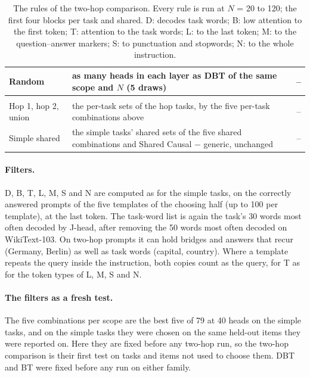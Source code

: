 \documentclass[10pt,a4paper]{article}
\begin{document}
\begin{table}[tbp]
\begin{tabularx}{\textwidth}{@{}>{\raggedright\arraybackslash}p{4.2cm}Lc@{}}
Random & as many heads in each layer as DBT of the same scope and $N$ (5 draws) & -- \\
\midrule
{} \\
Hop 1, hop 2, union & the per-task sets of the hop tasks, by the five per-task combinations above & -- \\
Simple shared & the simple tasks' shared sets of the five shared combinations and Shared Causal $-$ generic, unchanged & -- \\
\bottomrule
\end{tabularx}
\caption{The rules of the two-hop comparison. Every rule is run at $N$ = 20 to 120; the first four blocks per task and shared. D: decodes task words; B: low attention to the first token; T: attention to the task words; L: to the last token; M: to the question--answer markers; S: to punctuation and stopwords; N: to the whole instruction.}
\label{tab:approaches}
\end{table}

\paragraph{Filters.} D, B, T, L, M, S and N are computed as for the simple tasks, on the correctly answered prompts of the five templates of the choosing half (up to 100 per template), at the last token. The task-word list is again the task's 30 words most often decoded by J-head, after removing the 50 words most often decoded on WikiText-103. On two-hop prompts it can hold bridges and answers that recur (Germany, Berlin) as well as task words (capital, country). Where a template repeats the query inside the instruction, both copies count as the query, for T as for the token types of L, M, S and N.

\paragraph{The filters as a fresh test.} The five combinations per scope are the best five of 79 at 40 heads on the simple tasks, and on the simple tasks they were chosen on the same held-out items they were reported on. Here they are fixed before any two-hop run, so the two-hop comparison is their first test on tasks and items not used to choose them. DBT and BT were fixed before any run on either family.
\end{document}
